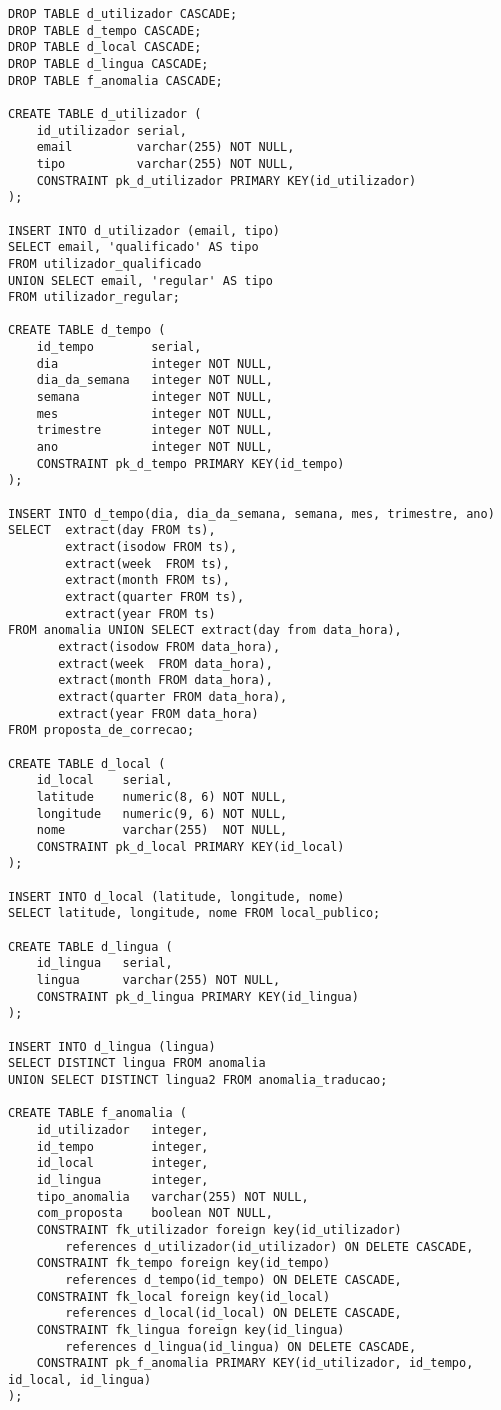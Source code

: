 \documentclass[12pt]{report}
\begin{document}
    \footnotesize \begin{verbatim}
DROP TABLE d_utilizador CASCADE;
DROP TABLE d_tempo CASCADE;
DROP TABLE d_local CASCADE;
DROP TABLE d_lingua CASCADE;
DROP TABLE f_anomalia CASCADE;

CREATE TABLE d_utilizador (
    id_utilizador serial,
    email         varchar(255) NOT NULL,
    tipo          varchar(255) NOT NULL,
    CONSTRAINT pk_d_utilizador PRIMARY KEY(id_utilizador)
);

INSERT INTO d_utilizador (email, tipo)
SELECT email, 'qualificado' AS tipo
FROM utilizador_qualificado
UNION SELECT email, 'regular' AS tipo
FROM utilizador_regular;

CREATE TABLE d_tempo (
    id_tempo        serial,
    dia             integer NOT NULL,
    dia_da_semana   integer NOT NULL,
    semana          integer NOT NULL,
    mes             integer NOT NULL,
    trimestre       integer NOT NULL,
    ano             integer NOT NULL,
    CONSTRAINT pk_d_tempo PRIMARY KEY(id_tempo)
);

INSERT INTO d_tempo(dia, dia_da_semana, semana, mes, trimestre, ano)
SELECT  extract(day FROM ts),
        extract(isodow FROM ts),
        extract(week  FROM ts),
        extract(month FROM ts),
        extract(quarter FROM ts),
        extract(year FROM ts)
FROM anomalia UNION SELECT extract(day from data_hora),
       extract(isodow FROM data_hora),
       extract(week  FROM data_hora),
       extract(month FROM data_hora),
       extract(quarter FROM data_hora),
       extract(year FROM data_hora)
FROM proposta_de_correcao;

CREATE TABLE d_local (
    id_local    serial,
    latitude    numeric(8, 6) NOT NULL,
    longitude   numeric(9, 6) NOT NULL,
    nome        varchar(255)  NOT NULL,
    CONSTRAINT pk_d_local PRIMARY KEY(id_local)
);

INSERT INTO d_local (latitude, longitude, nome)
SELECT latitude, longitude, nome FROM local_publico;

CREATE TABLE d_lingua (
    id_lingua   serial,
    lingua      varchar(255) NOT NULL,
    CONSTRAINT pk_d_lingua PRIMARY KEY(id_lingua)
);

INSERT INTO d_lingua (lingua)
SELECT DISTINCT lingua FROM anomalia
UNION SELECT DISTINCT lingua2 FROM anomalia_traducao;

CREATE TABLE f_anomalia (
    id_utilizador   integer,
    id_tempo        integer,
    id_local        integer,
    id_lingua       integer,
    tipo_anomalia   varchar(255) NOT NULL,
    com_proposta    boolean NOT NULL,
    CONSTRAINT fk_utilizador foreign key(id_utilizador)
        references d_utilizador(id_utilizador) ON DELETE CASCADE,
    CONSTRAINT fk_tempo foreign key(id_tempo)
        references d_tempo(id_tempo) ON DELETE CASCADE,
    CONSTRAINT fk_local foreign key(id_local)
        references d_local(id_local) ON DELETE CASCADE,
    CONSTRAINT fk_lingua foreign key(id_lingua)
        references d_lingua(id_lingua) ON DELETE CASCADE,
    CONSTRAINT pk_f_anomalia PRIMARY KEY(id_utilizador, id_tempo, id_local, id_lingua)
);


\end{verbatim}
\end{document}
